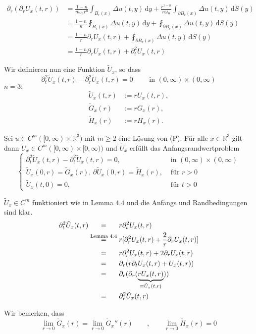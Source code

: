 \begin{beweis}
\begin{align*}
	\partial_r ( \partial_r U_x(t,r)) &= \frac{1-n}{n \omega_n r^n} \int_{B_r(x)}^{} \Delta u(t,y) \,\mathrm{d}y 
	+ \frac{r^{1-n}}{n \omega_n} \int_{\partial B_r(x)}^{} \Delta u(t,y) \,\mathrm{d}S(y) \\
	&= \frac{1-n}{n} \fint_{B_r(x)}^{} \Delta u(t,y) \,\mathrm{d}y + \fint_{\partial B_r(x)}^{} \Delta u(t,y) \,\mathrm{d}S(y) \\
	&= \frac{1-n}{r} \partial_r U_x(t,r) + \fint_{\partial B_r(x)}^{} \Delta u(t,y) \,\mathrm{d}S(y) \\
	&= \frac{1-n}{r} \partial_r U_x(t,r) + \partial_t^2 U_x(t,r)
\end{align*}
\end{beweis}
Wir definieren nun eine Funktion $\tilde U_x$, so dass
\[
	\partial_t^2 \tilde U_x(t,r) - \partial_r^2 \tilde U_x(t,r) = 0 \qquad \text{ in } (0,\infty) \times (0,\infty)
\]
$n=3:$
\begin{align*}
	\tilde U_x(t,r) &:= r U_x(t,r), \\
	\tilde G_x(r) &:= r G_x(r), \\
	\tilde H_x(r) &:= r H_x(r).
\end{align*}
\begin{korollar}
	Sei $u \in C^m([0,\infty)\times \mathbb{R}^3)$ mit $m \geq 2$ eine Lösung von (P). Für alle $x \in \mathbb{R}^3$ gilt dann $ \tilde U_x \in C^m([0,\infty) \times [0, \infty))$ und $\tilde U_x$ erfüllt das Anfangsrandwertproblem
	\[
		\begin{cases}
			\partial_t^2 \tilde U_x(t,r) - \partial^2_t \tilde U_x(t,r)=0, &\text{ in }(0, \infty) \times (0, \infty)\\
			\tilde U_x(0,r) = \tilde G_x(r), \, \partial \tilde U_x(0,r) = \tilde H_x(r), &\text{ für }r >0 \\
			\tilde U_x(t,0) = 0 , &\text{ für }t>0
		\end{cases}
	\]
\end{korollar}
\begin{beweis}
	$\tilde U_x \in C^m$ funktioniert wie in Lemma $4.4$ und die Anfangs und Randbedingungen sind klar.
	\begin{align*}
			\partial^2_t \tilde U_x(t,r) & \stackrel{\hphantom{\text{Lemma }4.4}}{=} r \partial_t^2 U_x(t,r) \\
			&\stackrel{\text{Lemma }4.4}{=} r [ \partial_r^2 U_x(t,r) + \frac{2}{r} \partial_r U_x(t,r)] \\
			& \stackrel{\hphantom{\text{Lemma }4.4}}{=} r \partial_r^2 U_x(t,r) + 2 \partial_rU_x(t,r) \\
			& \stackrel{\hphantom{\text{Lemma }4.4}}{=} \partial_r(r \partial_t U_x(t,r)+ U_x(t,r)) \\
			& \stackrel{\hphantom{\text{Lemma }4.4}}{=} \partial_r (\partial_r (\underset{= \tilde U_x(t,r)}{\underbrace{r U_x(t,r)}})) \\
			& \stackrel{\hphantom{\text{Lemma }4.4}}{=} \partial_r^2 \tilde U_x(t,r)
	\end{align*}
\end{beweis}
Wir bemerken, dass 
\[
	\lim_{r \to 0} \tilde G_x(r) = \lim_{r \to 0} \tilde G_x''(r) \qquad , \qquad \lim_{r \to 0} \tilde H_x(r) = 0
\]


